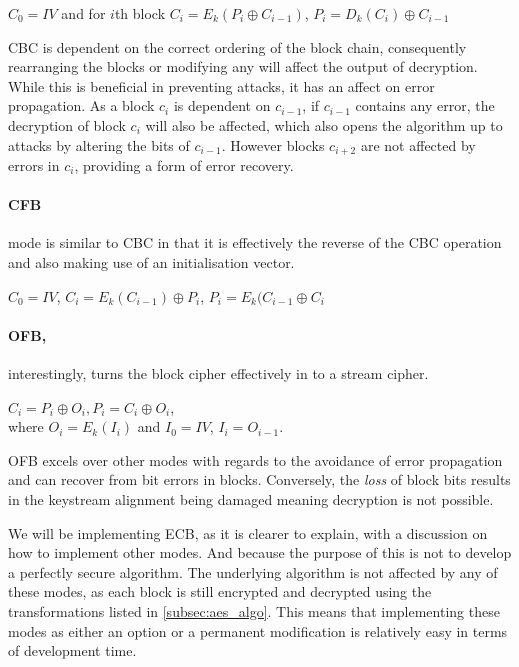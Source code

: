   \begin{center}
    $C_0 = IV$ and for $i$th block $C_i = E_k(P_i \oplus C_{i-1})$, $P_i = D_k(C_i) \oplus C_{i-1}$
  \end{center}
  
  CBC is dependent on the correct ordering of the block chain, consequently rearranging the blocks or modifying any will affect the output of decryption. While this is beneficial in preventing attacks, it has an affect on error propagation. As a block $c_i$ is dependent on $c_{i-1}$, if $c_{i-1}$ contains any error, the decryption of block $c_i$ will also be affected, which also opens the algorithm up to attacks by altering the bits of $c_{i-1}$. However blocks $c_{i+2}$ are not affected by errors in $c_i$, providing a form of error recovery.
  
  \paragraph{CFB} mode is similar to CBC in that it is effectively the reverse of the CBC operation and also making use of an initialisation vector.
  
  \begin{center}
    $C_0 = IV$, $C_i = E_k(C_{i-1}) \oplus P_i$, $P_i = E_k(C_{i-1} \oplus C_i$
  \end{center}
  
  \paragraph{OFB,} interestingly, turns the block cipher effectively in to a stream cipher.   
  
  \begin{center}
    $C_i = P_i \oplus O_i, P_i = C_i \oplus O_i$, \\
    where $O_i = E_k(I_i)$ and $I_0 = IV$, $I_i = O_{i-1}$.
  \end{center}
  
  OFB excels over other modes with regards to the avoidance of error propagation and can recover from bit errors in blocks. Conversely, the \emph{loss} of block bits results in the keystream alignment being damaged meaning decryption is not possible.
  
  We will be implementing ECB, as it is clearer to explain, with a discussion on how to implement other modes. And because the purpose of this is not to develop a perfectly secure algorithm. The underlying algorithm is not affected by any of these modes, as each block is still encrypted and decrypted using the transformations listed in \textsection\ref{subsec:aes_algo}. This means that implementing these modes as either an option or a permanent modification is relatively easy in terms of development time.
  
